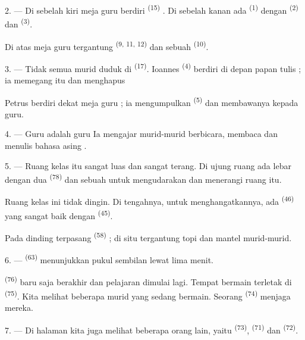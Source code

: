 2. --- Di sebelah kiri meja guru berdiri 
\textsuperscript{(15)} . Di sebelah kanan ada
 \textsuperscript{(1)} dengan 
\textsuperscript{(2)} dan  \textsuperscript{(3)}.

Di atas meja guru tergantung  \textsuperscript{(9,
11, 12)} dan sebuah  \textsuperscript{(10)}.

3. --- Tidak semua murid duduk di 
\textsuperscript{(17)}. Ioannes \textsuperscript{(4)} berdiri di depan
papan tulis ; ia memegang  itu dan menghapus

Petrus berdiri dekat meja guru ; ia mengumpulkan  \textsuperscript{(5)} dan membawanya kepada guru.

4. --- Guru  adalah guru  Ia
mengajar murid-murid berbicara, membaca dan menulis bahasa asing
.

5. --- Ruang kelas itu sangat luas dan sangat terang. Di ujung ruang
ada  lebar dengan dua 
\textsuperscript{(78)} dan sebuah  untuk
mengudarakan dan menerangi ruang itu.

Ruang kelas ini tidak dingin. Di tengahnya, untuk menghangatkannya,
ada  \textsuperscript{(46)} yang sangat baik dengan
 \textsuperscript{(45)}.

Pada dinding terpasang  \textsuperscript{(58)} ;
di situ tergantung topi dan mantel murid-murid.

\VUsaut{5.2mm}
\VUsaut{3.6mm}

6. ---  \textsuperscript{(63)} menunjukkan pukul
sembilan lewat lima menit.

 \textsuperscript{(76)} baru saja berakhir dan
pelajaran dimulai lagi. Tempat bermain terletak di 
\textsuperscript{(75)}. Kita melihat beberapa murid yang sedang
bermain. Seorang  \textsuperscript{(74)} menjaga
mereka.

7. --- Di halaman kita juga melihat beberapa orang lain, yaitu
 \textsuperscript{(73)},  \textsuperscript{(71)} dan 
\textsuperscript{(72)}.

